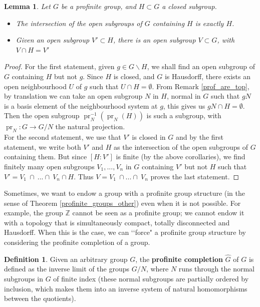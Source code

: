 \documentclass{article}
\theoremstyle{plain}
\newtheorem{lemma}[theorem]{Lemma}
\theoremstyle{definition}
\newtheorem{definition}[theorem]{Definition}
\DeclareMathOperator{\pr}{pr}
\begin{document}
\begin{lemma}
\label{lemma_profinite}
    Let $G$ be a profinite group, and $H\subset G$ a closed subgroup.
    \begin{itemize}
        \item[$a)$] The intersection of the open subgroups of $G$ containing $H$ is exactly $H$.
        \item[$b)$] Given an open subgroup $V'\subset H$, there is an open subgroup $V\subset G$, with $V\cap H = V'$
    \end{itemize}
\end{lemma}
\begin{proof}
    For the first statement, given $g\in G\backslash H$, we shall find an open subgroup of $G$ containing $H$ but not $g$.
    Since $H$ is closed, and $G$ is Hausdorff, there exists an open neighbourhood $U$ of $g$ such that $U\cap H = \emptyset$. 
    From Remark \ref{prof_are_top}, by translation we can take an open subgroup $N$ in $H$, normal in $G$ such that $gN$ is a basis element of the neighbourhood system at $g$, this gives us $gN\cap H = \emptyset$.
    Then the open subgroup $\pr_N^{-1}(\pr_N(H))$ is such a subgroup, with $\pr_N: G\rightarrow G/N$ the natural projection.\\
    For the second statement, we use that $V'$ is closed in $G$ and by the first statement, we write both $V'$ and $H$ as the intersection of the open subgroups of $G$ containing them.
    But since $[H:V']$ is finite (by the above corollaries), we find finitely many open subgroups $V_1,...,V_n$ in $G$ containing $V'$ but not $H$ such that $V'= V_1\:\cap\:...\cap\: V_n\cap H$. Thus $V = V_1\:\cap...\cap\:V_n$ proves the last statement.
\end{proof}



\noindent Sometimes, we want to endow a group with a profinite group structure (in the sense of Theorem \ref{profinite_groups_other}) even when it is not possible. 
For example, the group $\mathbb{Z}$ cannot be seen as a profinite group; we cannot endow it with a topology that is simultaneously compact, totally disconnected and Hausdorff. 
When this is the case, we can ‘‘force" a profinite group structure by considering the profinite completion of a group.



\begin{definition}
    Given an arbitrary group $G$, the \textbf{profinite completion} $\hat{G}$ of $G$ is defined as the inverse limit of the groups $G/N$, where $N$ runs through the normal subgroups in $G$ of finite index (these normal subgroups are partially ordered by inclusion, which makes them into an inverse system of natural homomorphisms between the quotients).
\end{definition}
\end{document}
